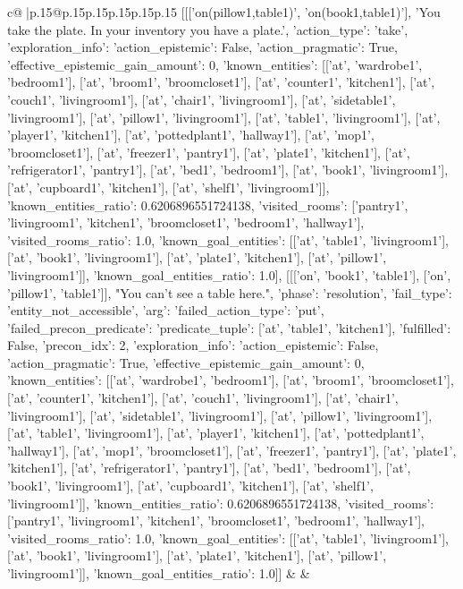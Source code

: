 \documentclass{article}
\begin{document}
{\begin{supertabular}{c@{$\;$}|p{.15\linewidth}@{}p{.15\linewidth}p{.15\linewidth}p{.15\linewidth}p{.15\linewidth}p{.15\linewidth}}
{{{	 [[['on(pillow1,table1)', 'on(book1,table1)'], 'You take the plate. In your inventory you have a plate.', {'action_type': 'take', 'exploration_info': {'action_epistemic': False, 'action_pragmatic': True, 'effective_epistemic_gain_amount': 0, 'known_entities': [['at', 'wardrobe1', 'bedroom1'], ['at', 'broom1', 'broomcloset1'], ['at', 'counter1', 'kitchen1'], ['at', 'couch1', 'livingroom1'], ['at', 'chair1', 'livingroom1'], ['at', 'sidetable1', 'livingroom1'], ['at', 'pillow1', 'livingroom1'], ['at', 'table1', 'livingroom1'], ['at', 'player1', 'kitchen1'], ['at', 'pottedplant1', 'hallway1'], ['at', 'mop1', 'broomcloset1'], ['at', 'freezer1', 'pantry1'], ['at', 'plate1', 'kitchen1'], ['at', 'refrigerator1', 'pantry1'], ['at', 'bed1', 'bedroom1'], ['at', 'book1', 'livingroom1'], ['at', 'cupboard1', 'kitchen1'], ['at', 'shelf1', 'livingroom1']], 'known_entities_ratio': 0.6206896551724138, 'visited_rooms': ['pantry1', 'livingroom1', 'kitchen1', 'broomcloset1', 'bedroom1', 'hallway1'], 'visited_rooms_ratio': 1.0, 'known_goal_entities': [['at', 'table1', 'livingroom1'], ['at', 'book1', 'livingroom1'], ['at', 'plate1', 'kitchen1'], ['at', 'pillow1', 'livingroom1']], 'known_goal_entities_ratio': 1.0}}], [[['on', 'book1', 'table1'], ['on', 'pillow1', 'table1']], "You can't see a table here.", {'phase': 'resolution', 'fail_type': 'entity_not_accessible', 'arg': {'failed_action_type': 'put', 'failed_precon_predicate': {'predicate_tuple': ['at', 'table1', 'kitchen1'], 'fulfilled': False, 'precon_idx': 2}}, 'exploration_info': {'action_epistemic': False, 'action_pragmatic': True, 'effective_epistemic_gain_amount': 0, 'known_entities': [['at', 'wardrobe1', 'bedroom1'], ['at', 'broom1', 'broomcloset1'], ['at', 'counter1', 'kitchen1'], ['at', 'couch1', 'livingroom1'], ['at', 'chair1', 'livingroom1'], ['at', 'sidetable1', 'livingroom1'], ['at', 'pillow1', 'livingroom1'], ['at', 'table1', 'livingroom1'], ['at', 'player1', 'kitchen1'], ['at', 'pottedplant1', 'hallway1'], ['at', 'mop1', 'broomcloset1'], ['at', 'freezer1', 'pantry1'], ['at', 'plate1', 'kitchen1'], ['at', 'refrigerator1', 'pantry1'], ['at', 'bed1', 'bedroom1'], ['at', 'book1', 'livingroom1'], ['at', 'cupboard1', 'kitchen1'], ['at', 'shelf1', 'livingroom1']], 'known_entities_ratio': 0.6206896551724138, 'visited_rooms': ['pantry1', 'livingroom1', 'kitchen1', 'broomcloset1', 'bedroom1', 'hallway1'], 'visited_rooms_ratio': 1.0, 'known_goal_entities': [['at', 'table1', 'livingroom1'], ['at', 'book1', 'livingroom1'], ['at', 'plate1', 'kitchen1'], ['at', 'pillow1', 'livingroom1']], 'known_goal_entities_ratio': 1.0}}]] 
	  } 
	   } 
	   } 
	 & & \\ 
 


\end{supertabular}}
\end{document}
